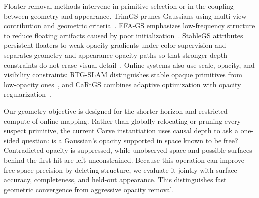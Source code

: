 Floater-removal methods intervene in primitive selection or in the coupling
between geometry and appearance. TrimGS prunes Gaussians using multi-view
contribution and geometric criteria~\cite{fan2024trimgs}. EFA-GS emphasizes
low-frequency structure to reduce floating artifacts caused by poor
initialization~\cite{wang2025efags}. StableGS attributes persistent floaters to
weak opacity gradients under color supervision and separates geometry and
appearance opacity paths so that stronger depth constraints do not erase
visual detail~\cite{stablegs}. Online systems also use scale, opacity, and
visibility constraints: RTG-SLAM distinguishes stable opaque primitives from
low-opacity ones~\cite{rtgslam2024}, and CaRtGS combines adaptive optimization
with opacity regularization~\cite{cartgs}.

Our geometry objective is designed for the shorter horizon and restricted
compute of online mapping. Rather than globally relocating or pruning every
suspect primitive, the current Carve instantiation uses causal depth to ask a
one-sided question: is a Gaussian's opacity supported in space known to be
free? Contradicted opacity is suppressed, while unobserved space and possible
surfaces behind the first hit are left unconstrained. Because this operation
can improve free-space precision by deleting structure, we evaluate it jointly
with surface accuracy, completeness, and held-out appearance. This distinguishes
fast geometric convergence from aggressive opacity removal.

